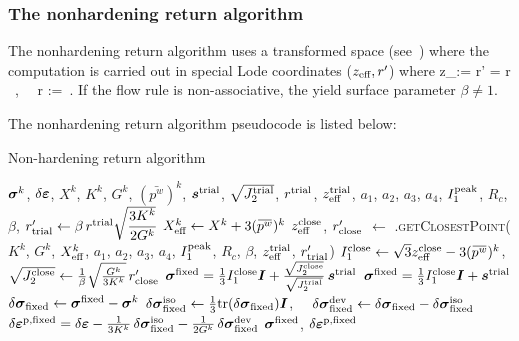 \subsubsection{The nonhardening return algorithm}
\label{sec:nonhardening_return}
The nonhardening return algorithm uses a transformed space (see~\cite{Homel2015}) where the computation 
is carried out in special Lode coordinates ($z_{\text{eff}}, r'$) where
\BBeq
  z_\Teff :=   \quad \Tand \quad
  r' = \beta r  ~,~~ r :=  \,.
\BEeq
If the flow rule is non-associative, the yield surface parameter $\beta \ne 1$. 


The nonhardening return algorithm pseudocode is listed below:
\begin{breakablealgorithm}
\caption{Non-hardening return algorithm}
\begin{algorithmic}[1]
  \Require $\boldsymbol{\sigma}^k$, $\delta\boldsymbol{\varepsilon}$, $X^k$, $K^k$, $G^k$, $(\bar{p^w})^k$, 
           $\boldsymbol{s}^{\text{trial}}$, $\sqrt{J_2^{\text{trial}}}$, $r^{\text{trial}}$, $z_{\text{eff}}^{\text{trial}}$, 
           $a_1$, $a_2$, $a_3$, $a_4$, $I_1^{\text{peak}}$, $R_c$, $\beta$, 
  \State $r'_{\text{trial}} \leftarrow \beta\,r^{\text{trial}} \sqrt{\cfrac{3K^k}{2G^k}}$
  \State $X_\Teff^k \leftarrow X^k + 3 (\bar{p^w})^k$
  \State $z_{\text{eff}}^{\text{close}}$, $r'_{\text{close}}$ $\leftarrow$ 
           .\textsc{getClosestPoint}($K^k$, $G^k$, $X_{\text{eff}}^k$, $a_1$, $a_2$, 
           $a_3$, $a_4$, $I_1^{\text{peak}}$, $R_c$, $\beta$, \WRP $z_{\text{eff}}^{\text{trial}}$, $r'_{\text{trial}}$)
  \State $I_1^{\Tclose} \leftarrow \sqrt{3} z_\Teff^\Tclose - 3 (\bar{p^w})^k$,
         $\sqrt{J_2^{\text{close}}} \leftarrow \frac{1}{\beta}\sqrt{\frac{G^k}{3K^k}}\,r'_{\text{close}}$
     \State $\boldsymbol{\sigma}^{\text{fixed}} = \tfrac{1}{3} I_1^{\text{close}} \boldsymbol{I} + \frac{\sqrt{J_2^{\text{close}}}}{\sqrt{J_2^{\text{trial}}}}\,\boldsymbol{s}^{\text{trial}}$
  \Else
     \State $\boldsymbol{\sigma}^{\text{fixed}} = \tfrac{1}{3} I_1^{\text{close}} \boldsymbol{I} + \boldsymbol{s}^{\text{trial}}$
  \EndIf
  \State $\delta\boldsymbol{\sigma}_{\text{fixed}} \leftarrow \boldsymbol{\sigma}^{\text{fixed}} - \boldsymbol{\sigma}^k$
  \State $\delta\boldsymbol{\sigma}_{\text{fixed}}^{\text{iso}} \leftarrow \frac{1}{3} \text{tr}(\delta\boldsymbol{\sigma}_{\text{fixed}}) \boldsymbol{I}$, 
         $\quad \delta\boldsymbol{\sigma}_{\text{fixed}}^{\text{dev}} \leftarrow \delta\boldsymbol{\sigma}_{\text{fixed}} - \delta\boldsymbol{\sigma}_{\text{fixed}}^{\text{iso}}$ 
  \State $\delta\boldsymbol{\varepsilon}^{\text{p},\text{fixed}} = \delta\boldsymbol{\varepsilon} - \frac{1}{3K^k}\,\delta\boldsymbol{\sigma}_{\text{fixed}}^{\text{iso}} -
           \frac{1}{2G^k}\,\delta\boldsymbol{\sigma}_{\text{fixed}}^{\text{dev}}$
  \State \Return $\boldsymbol{\sigma}^{\text{fixed}}$, $\delta\boldsymbol{\varepsilon}^{\text{p},\text{fixed}}$
  \EndProcedure
\end{algorithmic}
\end{breakablealgorithm}

